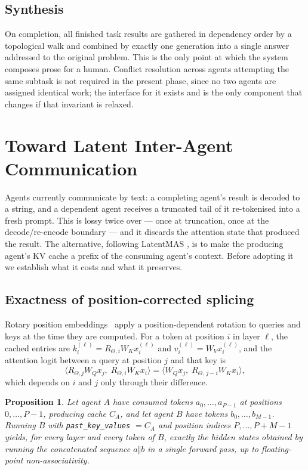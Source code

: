 \documentclass[11pt]{article}
\newtheorem{proposition}{Proposition}
\begin{document}
\subsection{Synthesis}

On completion, all finished task results are gathered in dependency order by a
topological walk and combined by exactly one generation into a single answer
addressed to the original problem. This is the only point at which the system
composes prose for a human. Conflict resolution across agents attempting the
same subtask is not required in the present phase, since no two agents are
assigned identical work; the interface for it exists and is the only component
that changes if that invariant is relaxed.

\section{Toward Latent Inter-Agent Communication}
\label{sec:latent}

Agents currently communicate by text: a completing agent's result is decoded to
a string, and a dependent agent receives a truncated tail of it re-tokenised
into a fresh prompt. This is lossy twice over --- once at truncation, once at
the decode/re-encode boundary --- and it discards the attention state that
produced the result. The alternative, following LatentMAS
\cite{latentmas2025}, is to make the producing agent's KV cache a prefix of the
consuming agent's context. Before adopting it we establish what it costs and
what it preserves.

\subsection{Exactness of position-corrected splicing}

Rotary position embeddings~\cite{su2021rope} apply a position-dependent
rotation to queries and keys at the time they are computed. For a token at
position $i$ in layer $\ell$, the cached entries are
$k_i^{(\ell)} = R_{\Theta,i} W_K x_i^{(\ell)}$ and
$v_i^{(\ell)} = W_V x_i^{(\ell)}$, and the attention logit between a query at
position $j$ and that key is
\begin{equation}
\langle R_{\Theta,j} W_Q x_j,\; R_{\Theta,i} W_K x_i \rangle
= \langle W_Q x_j,\; R_{\Theta,\,j-i} W_K x_i \rangle ,
\label{eq:rope}
\end{equation}
which depends on $i$ and $j$ only through their difference.

\begin{proposition}
\label{prop:splice}
Let agent $A$ have consumed tokens $a_0,\dots,a_{P-1}$ at positions
$0,\dots,P-1$, producing cache $C_A$, and let agent $B$ have tokens
$b_0,\dots,b_{M-1}$. Running $B$ with \texttt{past\_key\_values} $= C_A$ and
position indices $P,\dots,P+M-1$ yields, for every layer and every token of
$B$, exactly the hidden states obtained by running the concatenated sequence
$a \Vert b$ in a single forward pass, up to floating-point non-associativity.
\end{proposition}
\end{document}
